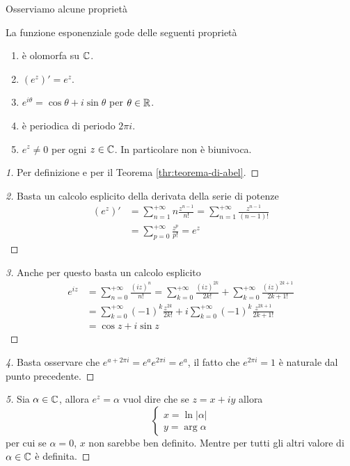 Osserviamo alcune proprietà 

\begin{theorem}
	La funzione esponenziale gode delle seguenti proprietà
	\begin{enumerate}
		\item è olomorfa su $\mathbb{C}$.
		\item $(e^z)' = e^z$.
		\item $e^{i\theta} = \cos \theta + i\sin \theta$ per $\theta \in \mathbb{R}$.
		\item è periodica di periodo $2\pi i$.
		\item $e^z \neq 0$ per ogni $z \in \mathbb{C}$. In particolare non è biunivoca.
	\end{enumerate}
\end{theorem}
\begin{proof}[1]
	Per definizione e per il Teorema \ref{thr:teorema-di-abel}.
\end{proof}
\begin{proof}[2]
	Basta un calcolo esplicito della derivata della serie di potenze
	\begin{equation}
	\begin{aligned}
		(e^z)' & = \sum^{+\infty}_{n=1} n\frac{z^{n-1}}{n!} = \sum^{+\infty}_{n=1} \frac{z^{n-1}}{(n-1)!} \\
				& = \sum^{+\infty}_{p=0} \frac{z^p}{p!} = e^z 
	\end{aligned}
	\end{equation}
\end{proof}
\begin{proof}[3]
	Anche per questo basta un calcolo esplicito
	\begin{equation}
	\begin{aligned}
		e^{iz} & = \sum^{+\infty}_{n=0} \frac{(iz)^{n}}{n!} = \sum^{+\infty}_{k=0} \frac{(iz)^{2k}}{2k!} + \sum^{+\infty}_{k=0} \frac{(iz)^{2k+1}}{2k+1!}\\
			& = \sum^{+\infty}_{k=0} (-1)^k\frac{z^{2k}}{2k!} + i\sum^{+\infty}_{k=0} (-1)^k\frac{z^{2k+1}}{2k+1!}\\
			& = \cos z + i \sin z
	\end{aligned}
	\end{equation}
\end{proof}
\begin{proof}[4]
	Basta osservare che $e^{a + 2\pi i} = e^a e^{2\pi i } = e^a$, il fatto che $e^{2\pi i} = 1$ è naturale dal punto precedente.
\end{proof}
\begin{proof}[5]
	Sia $\alpha \in \mathbb{C}$, allora $e^z = \alpha$ vuol dire che se $z = x+iy$ allora 
	\begin{equation}
	\begin{cases}
		x = \ln |\alpha|\\
		y = \arg \alpha
	\end{cases}
	\end{equation}
	per cui se $\alpha = 0$, $x$ non sarebbe ben definito. Mentre per tutti gli altri valore di $\alpha \in \mathbb{C}$ è definita.
\end{proof}

